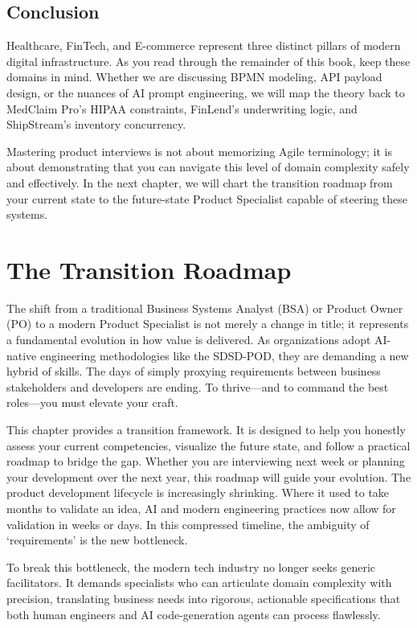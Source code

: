 \bigskip

\section{Conclusion}\label{conclusion}

Healthcare, FinTech, and E-commerce represent three distinct pillars of
modern digital infrastructure. As you read through the remainder of this
book, keep these domains in mind. Whether we are discussing BPMN
modeling, API payload design, or the nuances of AI prompt engineering,
we will map the theory back to MedClaim Pro's HIPAA constraints,
FinLend's underwriting logic, and ShipStream's inventory concurrency.

Mastering product interviews is not about memorizing Agile terminology;
it is about demonstrating that you can navigate this level of domain
complexity safely and effectively. In the next chapter, we will chart
the transition roadmap from your current state to the future-state
Product Specialist capable of steering these systems.

\chapter{The Transition Roadmap}\label{the-transition-roadmap}

The shift from a traditional Business Systems Analyst (BSA) or Product
Owner (PO) to a modern Product Specialist is not merely a change in
title; it represents a fundamental evolution in how value is delivered.
As organizations adopt AI-native engineering methodologies like the
SDSD-POD, they are demanding a new hybrid of skills. The days of simply
proxying requirements between business stakeholders and developers are
ending. To thrive---and to command the best roles---you must elevate
your craft.

This chapter provides a transition framework. It is designed to help you
honestly assess your current competencies, visualize the future state,
and follow a practical roadmap to bridge the gap. Whether you are
interviewing next week or planning your development over the next year,
this roadmap will guide your evolution. The product development
lifecycle is increasingly shrinking. Where it used to take months to
validate an idea, AI and modern engineering practices now allow for
validation in weeks or days. In this compressed timeline, the ambiguity
of `requirements' is the new bottleneck.

To break this bottleneck, the modern tech industry no longer seeks
generic facilitators. It demands specialists who can articulate domain
complexity with precision, translating business needs into rigorous,
actionable specifications that both human engineers and AI
code-generation agents can process flawlessly.

